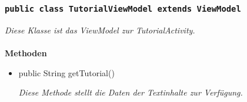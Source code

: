            		\subsubsection{\texttt{public class TutorialViewModel extends ViewModel}}
        \textit{Diese Klasse ist das ViewModel zur TutorialActivity.}\\
        \\
		\textbf{Methoden} \\
 			\begin{itemize}
        		\item{public String getTutorial()}
        		
        		\textit{Diese Methode stellt die Daten der Textinhalte zur Verfügung.}
        	
       		 \end{itemize}